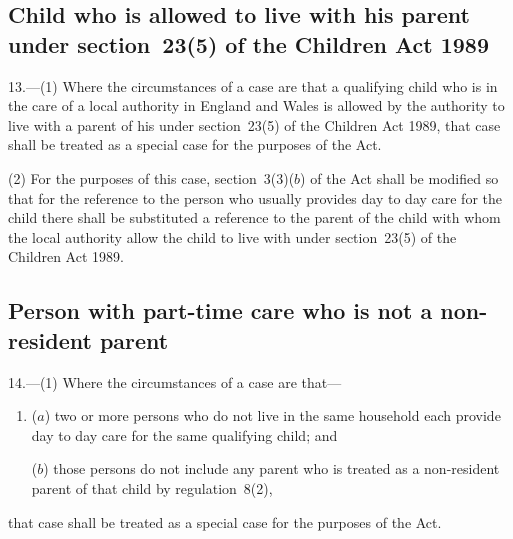 \documentclass[12pt,a4paper]{article}
\begin{document}
\subsection[13. Child who is allowed to live with his parent under section~23(5) of the Children Act 1989]{Child who is allowed to live with his parent under section~23(5) of the Children Act 1989}

13.---(1)  Where the circumstances of a case are that a qualifying child who is in the care of a local authority in England and Wales is allowed by the authority to live with a parent of his under section~23(5) of the Children Act 1989, that case shall be treated as a special case for the purposes of the Act.

(2) For the purposes of this case, section~3(3)($b$)  of the Act shall be modified so that for the reference to the person who usually provides day to day care for the child there shall be substituted a reference to the parent of the child with whom the local authority allow the child to live with under section~23(5) of the Children Act 1989.

\subsection[14. Person with part-time care who is not a non-resident parent]{Person with part-time care who is not a non-resident parent}

14.---(1)  Where the circumstances of a case are that—
\begin{enumerate}\item[]
($a$) two or more persons who do not live in the same household each provide day to day care for the same qualifying child; and

($b$) those persons do not include any parent who is treated as a non-resident parent of that child by regulation~8(2),
\end{enumerate}
that case shall be treated as a special case for the purposes of the Act.
\end{document}
